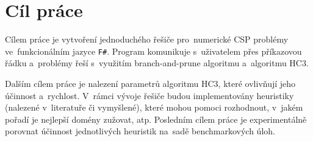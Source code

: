 \chapter{Cíl práce}
Cílem práce je vytvoření jednoduchého řešiče pro~numerické CSP problémy ve~funkcionálním jazyce \texttt{F\#}. Program komunikuje s~uživatelem přes příkazovou řádku a~problémy řeší s~využitím branch-and-prune algoritmu a~algoritmu HC3.

Dalším cílem práce je nalezení parametrů algoritmu HC3, které ovlivňují jeho účinnost a~rychlost. V~rámci vývoje řešiče budou implementovány heuristiky (nalezené v~literatuře či vymyšlené), které mohou pomoci rozhodnout, v~jakém pořadí je nejlepší domény zužovat, atp. Posledním cílem práce je experimentálně porovnat účinnost jednotlivých heuristik na~sadě benchmarkových úloh.